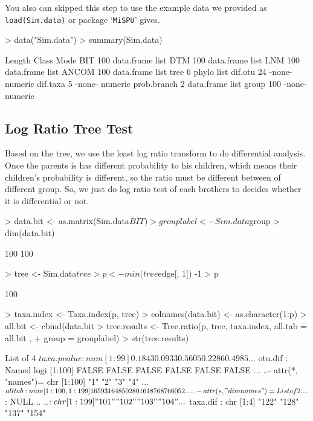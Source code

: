 \documentclass[a4paper]{article}
\newcommand{\code}{\texttt}
\begin{document}
You also can skipped this step to use the example data we provided as \code{load(Sim.data)} or package `\texttt{MiSPU}' gives.

\begin{Schunk}
\begin{Sinput}
> data("Sim.data")
> summary(Sim.data)
\end{Sinput}
\begin{Soutput}
            Length Class      Mode   
BIT         100    data.frame list   
DTM         100    data.frame list   
LNM         100    data.frame list   
ANCOM       100    data.frame list   
tree          6    phylo      list   
dif.otu      24    -none-     numeric
dif.taxa      5    -none-     numeric
prob.branch   2    data.frame list   
group       100    -none-     numeric
\end{Soutput}
\end{Schunk}

\subsection{Log Ratio Tree Test}

Based on the tree, we use the least log ratio transform to do differential analysis. Once the parents is has different probability to his children, which means their children's probability is different, so the ratio must be different between of different group. So, we just do log ratio test of each brothers to decides whether it is differential or not.

\begin{Schunk}
\begin{Sinput}
> data.bit <- as.matrix(Sim.data$BIT)
> grouplabel <- Sim.data$group
> dim(data.bit)
\end{Sinput}
\begin{Soutput}
[1] 100 100
\end{Soutput}
\begin{Sinput}
> tree <- Sim.data$tree
> p <- min(tree$edge[, 1]) -1
> p
\end{Sinput}
\begin{Soutput}
[1] 100
\end{Soutput}
\begin{Sinput}
> taxa.index <- Taxa.index(p, tree)
> colnames(data.bit) <- as.character(1:p)
> all.bit <- cbind(data.bit %*% taxa.index , data.bit)
> tree.results <- Tree.ratio(p, tree, taxa.index, all.tab = all.bit ,
+                            group = grouplabel)
> str(tree.results)
\end{Sinput}
\begin{Soutput}
List of 4
 $ taxa.pvalue: num [1:99] 0.1843 0.0933 0.5605 0.2286 0.4985 ...
 $ otu.dif    : Named logi [1:100] FALSE FALSE FALSE FALSE FALSE FALSE ...
  ..- attr(*, "names")= chr [1:100] "1" "2" "3" "4" ...
 $ alltab     : num [1:100, 1:199] 165931 64850 28016 187687 66052 ...
  ..- attr(*, "dimnames")=List of 2
  .. ..$ : NULL
  .. ..$ : chr [1:199] "101" "102" "103" "104" ...
 $ taxa.dif   : chr [1:4] "122" "128" "137" "154"
\end{Soutput}
\end{Schunk}
\end{document}

